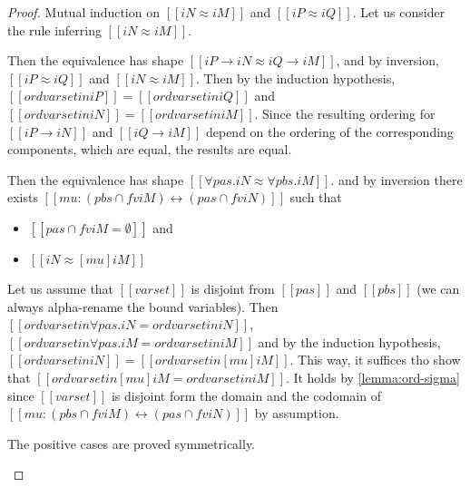 \lemOrdCompleteness*
\begin{proof}
  Mutual induction on $[[iN ≈ iM]]$ and $[[iP ≈ iQ]]$.
  Let us consider the rule inferring $[[iN ≈ iM]]$. 
  \begin{caseof}
    \item {}
    \item {}
    \item {}
      Then the equivalence has shape $[[iP → iN ≈ iQ → iM]]$,
      and by inversion, $[[iP ≈ iQ]]$ and $[[iN ≈ iM]]$.
      Then by the induction hypothesis,
      $[[ord varset in iP]] = [[ord varset in iQ]]$ 
      and $[[ord varset in iN]] = [[ord varset in iM]]$.
      Since the resulting ordering for $[[iP → iN]]$ and $[[iQ → iM]]$
      depend on the ordering of the corresponding components, 
      which are equal, the results are equal.
    \item {}
      Then the equivalence has shape $[[∀pas.iN ≈ ∀pbs.iM]]$.
      and by inversion there exists 
      $[[mu : ({pbs} ∩ fv iM) ↔ ({pas} ∩ fv iN)]]$ such that
      \begin{itemize}
        \item $[[{pas} ∩ fv iM = ∅]]$ and 
        \item $[[iN ≈ [mu] iM]]$
      \end{itemize}

      Let us assume that $[[varset]]$ is disjoint from 
      $[[pas]]$ and $[[pbs]]$ 
      (we can always alpha-rename the bound variables).
      Then $[[ord varset in ∀pas.iN = ord varset in iN]]$, 
      $[[ord varset in ∀pas.iM = ord varset in iM]]$
      and by the induction hypothesis,
      $[[ord varset in iN]] = [[ord varset in [mu]iM]]$.
      This way, it suffices tho show  that 
      $[[ord varset in [mu]iM = ord varset in iM]]$.
      It holds by \cref{lemma:ord-sigma} since
      $[[varset]]$ is disjoint form 
      the domain and the codomain of 
      $[[mu : ({pbs} ∩ fv iM) ↔ ({pas} ∩ fv iN)]]$ 
      by assumption.

    \item The positive cases are proved symmetrically.
  \end{caseof}
\end{proof}
